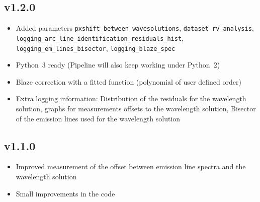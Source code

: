 \documentclass[10pt,a4paper]{article}
\begin{document}
\subsection*{v1.2.0}
\begin{itemize}\setlength\itemsep{0em}
  \item Added parameters \verb|pxshift_between_wavesolutions|, \verb|dataset_rv_analysis|,\\ \verb|logging_arc_line_identification_residuals_hist|, \verb|logging_em_lines_bisector|, \verb|logging_blaze_spec|
  \item Python~3 ready (Pipeline will also keep working under Python~2)
  \item Blaze correction with a fitted function (polynomial of user defined order)
  \item Extra logging information: Distribution of the residuals for the wavelength solution, graphs for measurements offsets to the wavelength solution, Bisector of the emission lines used for the wavelength solution
\end{itemize}

\subsection*{v1.1.0}
\begin{itemize}\setlength\itemsep{0em}
  \item Improved measurement of the offset between emission line spectra and the wavelength solution
  \item Small improvements in the code
\end{itemize}
\end{document}
